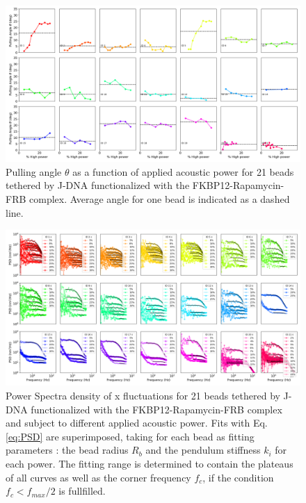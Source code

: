 \documentclass{biophys-new}
\begin{document}
\begin{figure}
	\centering
	 \centerline {\includegraphics[width=1.0\linewidth]{Figures/Power_Angles_Rapa.png}}
		\caption{Pulling angle $\theta$ as a function of applied acoustic power for 21 beads tethered by J-DNA functionalized with the FKBP12-Rapamycin-FRB complex. Average angle for one bead is indicated as a dashed line.}
	\label{fig:MultiAngle}	
\end{figure}


\begin{figure}
	\centering
	\centerline {\includegraphics[width=1\linewidth]{Figures/multispectrumx_Rapa.png}}
	\caption{Power Spectra density of x fluctuations for 21 beads tethered by J-DNA functionalized with the FKBP12-Rapamycin-FRB complex and subject to different applied acoustic power. Fits with Eq. \ref{eq:PSD} are superimposed, taking for each bead as fitting parameters : the bead radius $R_b$ and the pendulum stiffness $k_i$ for each power. The fitting range is determined to contain the plateaus of all curves as well as the corner frequency $f_c$, if the condition $f_c < f_{max}/2$ is fullfilled.}
	\label{fig:FitSpectra}
\end{figure}
\end{document}
